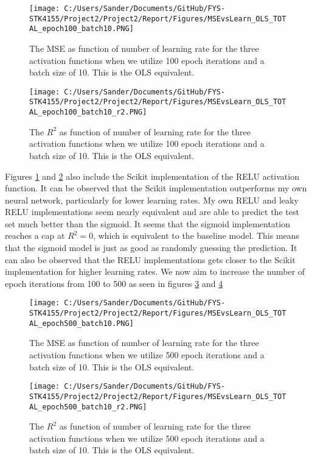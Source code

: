 \documentclass[12pt,a4paper]{article}
\begin{document}
\begin{figure}[H]
\centering
\texttt{[image: C:/Users/Sander/Documents/GitHub/FYS-STK4155/Project2/Project2/Report/Figures/MSEvsLearn\_OLS\_TOTAL\_epoch100\_batch10.PNG]}
\caption{\label{fig:MSEvsLrateTOTAL1} The MSE as function of number of learning rate for the three activation functions when we utilize 100 epoch iterations and a batch size of 10. This is the OLS equivalent.}
\end{figure}

\begin{figure}[H]
\centering
\texttt{[image: C:/Users/Sander/Documents/GitHub/FYS-STK4155/Project2/Project2/Report/Figures/MSEvsLearn\_OLS\_TOTAL\_epoch100\_batch10\_r2.PNG]}
\caption{\label{fig:MSEvsLrateTOTAL2} The $R^2$ as function of number of learning rate for the three activation functions when we utilize 100 epoch iterations and a batch size of 10. This is the OLS equivalent.}
\end{figure}

\noindent Figures \ref{fig:MSEvsLrateTOTAL1} and \ref{fig:MSEvsLrateTOTAL2} also include the Scikit implementation of the RELU activation function. It can be observed that the Scikit implementation outperforms my own neural network, particularly for lower learning rates. My own RELU and leaky RELU implementations seem nearly equivalent and are able to predict the test set much better than the sigmoid. It seems that the sigmoid implementation reaches a cap at $R^2 = 0$, which is equivalent to the baseline model. This means that the sigmoid model is just as good as randomly guessing the prediction. It can also be observed that the RELU implementations gets closer to the Scikit implementation for higher learning rates. We now aim to increase the number of epoch iterations from 100 to 500 as seen in figures \ref{fig:MSEvsLrateTOTAL3} and \ref{fig:MSEvsLrateTOTAL4}

\begin{figure}[H]
\centering
\texttt{[image: C:/Users/Sander/Documents/GitHub/FYS-STK4155/Project2/Project2/Report/Figures/MSEvsLearn\_OLS\_TOTAL\_epoch500\_batch10.PNG]}
\caption{\label{fig:MSEvsLrateTOTAL3} The MSE as function of number of learning rate for the three activation functions when we utilize 500 epoch iterations and a batch size of 10. This is the OLS equivalent.}
\end{figure}

\begin{figure}[H]
\centering
\texttt{[image: C:/Users/Sander/Documents/GitHub/FYS-STK4155/Project2/Project2/Report/Figures/MSEvsLearn\_OLS\_TOTAL\_epoch500\_batch10\_r2.PNG]}
\caption{\label{fig:MSEvsLrateTOTAL4} The $R^2$ as function of number of learning rate for the three activation functions when we utilize 500 epoch iterations and a batch size of 10. This is the OLS equivalent.}
\end{figure}
\end{document}
